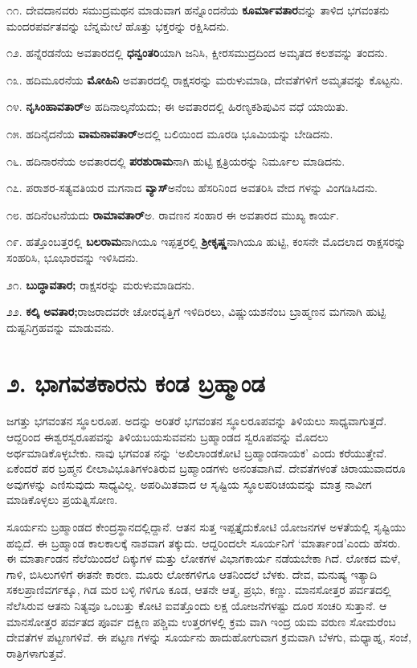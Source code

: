 ೧೧. ದೇವದಾನವರು ಸಮುದ್ರಮಥನ ಮಾಡುವಾಗ ಹನ್ನೊಂದನೆಯ \textbf{ಕೂರ್ಮಾವತಾರ}ವನ್ನು ತಾಳಿದ ಭಗವಂತನು ಮಂದರಪರ್ವತವನ್ನು ಬೆನ್ನಮೇಲೆ ಹೊತ್ತು ಭಕ್ತರನ್ನು ರಕ್ಷಿಸಿದನು.

೧೨. ಹನ್ನೆರಡನೆಯ ಅವತಾರದಲ್ಲಿ \textbf{ಧನ್ವಂತರಿ}ಯಾಗಿ ಜನಿಸಿ, ಕ್ಷೀರಸಮುದ್ರದಿಂದ ಅಮೃತದ ಕಲಶವನ್ನು ತಂದನು.

೧೩. ಹದಿಮೂರನೆಯ \textbf{ಮೋಹಿನಿ} ಅವತಾರದಲ್ಲಿ ರಾಕ್ಷಸರನ್ನು ಮರುಳುಮಾಡಿ, ದೇವತೆಗಳಿಗೆ ಅಮೃತವನ್ನು ಕೊಟ್ಟನು.

೧೪. \textbf{ನೃಸಿಂಹಾವತಾರ್}ಅ ಹದಿನಾಲ್ಕನೆಯದು; ಈ ಅವತಾರದಲ್ಲಿ ಹಿರಣ್ಯಕಶಿಪುವಿನ ವಧೆ ಯಾಯಿತು.

೧೫. ಹದಿನೈದನೆಯ \textbf{ವಾಮನಾವತಾರ್}ಅದಲ್ಲಿ ಬಲಿಯಿಂದ ಮೂರಡಿ ಭೂಮಿಯನ್ನು ಬೇಡಿದನು.

೧೬. ಹದಿನಾರನೆಯ ಅವತಾರದಲ್ಲಿ \textbf{ಪರಶುರಾಮ}ನಾಗಿ ಹುಟ್ಟಿ ಕ್ಷತ್ರಿಯರನ್ನು ನಿರ್ಮೂಲ ಮಾಡಿದನು.

೧೭. ಪರಾಶರ-ಸತ್ಯವತಿಯರ ಮಗನಾದ \textbf{ವ್ಯಾಸ್}ಅನೆಂಬ ಹೆಸರಿನಿಂದ ಅವತರಿಸಿ ವೇದ ಗಳನ್ನು ವಿಂಗಡಿಸಿದನು.

೧೮. ಹದಿನೆಂಟನೆಯದು \textbf{ರಾಮಾವತಾರ್}ಅ. ರಾವಣನ ಸಂಹಾರ ಈ ಅವತಾರದ ಮುಖ್ಯ ಕಾರ್ಯ.

 ೧೯. ಹತ್ತೊಂಬತ್ತರಲ್ಲಿ \textbf{ಬಲರಾಮ}ನಾಗಿಯೂ ಇಪ್ಪತ್ತರಲ್ಲಿ \textbf{ಶ್ರೀಕೃಷ್ಣ}ನಾಗಿಯೂ ಹುಟ್ಟಿ, ಕಂಸನೇ ಮೊದಲಾದ ರಾಕ್ಷಸರನ್ನು ಸಂಹರಿಸಿ, ಭೂಭಾರವನ್ನು ಇಳಿಸಿದನು.

೨೧. \textbf{ಬುದ್ಧಾವತಾರ;} ರಾಕ್ಷಸರನ್ನು ಮರುಳುಮಾಡಿದನು.

೨೨. \textbf{ಕಲ್ಕಿ ಅವತಾರ;}ರಾಜರಾದವರೇ ಚೋರವೃತ್ತಿಗೆ ಇಳಿದಿರಲು, ವಿಷ್ಣುಯಶನೆಂಬ ಬ್ರಾಹ್ಮಣನ ಮಗನಾಗಿ ಹುಟ್ಟಿ ದುಷ್ಟನಿಗ್ರಹವನ್ನು ಮಾಡುವನು.


\section{೨. ಭಾಗವತಕಾರನು ಕಂಡ ಬ್ರಹ್ಮಾಂಡ}

ಜಗತ್ತು ಭಗವಂತನ ಸ್ಥೂಲರೂಪ. ಅದನ್ನು ಅರಿತರೆ ಭಗವಂತನ ಸ್ಥೂಲರೂಪವನ್ನು ತಿಳಿಯಲು ಸಾಧ್ಯವಾಗುತ್ತದೆ. ಆದ್ದರಿಂದ ಈಶ್ವರಸ್ವರೂಪವನ್ನು ತಿಳಿಯಬಯಸುವವನು ಬ್ರಹ್ಮಾಂಡದ ಸ್ವರೂಪವನ್ನು ಮೊದಲು ಅರ್ಥಮಾಡಿಕೊಳ್ಳಬೇಕು. ನಾವು ಭಗವಂತ ನನ್ನು ‘ಅಖಿಲಾಂಡಕೋಟಿ ಬ್ರಹ್ಮಾಂಡನಾಯಕ’ ಎಂದು ಕರೆಯುತ್ತೇವೆ. ಏಕೆಂದರೆ ಪರ ಬ್ರಹ್ಮನ ಲೀಲಾವಿಭೂತಿಗಳಂತಿರುವ ಬ್ರಹ್ಮಾಂಡಗಳು ಅನಂತವಾಗಿವೆ. ದೇವತೆಗಳಂತೆ ಚಿರಾಯುವಾದರೂ ಅವುಗಳನ್ನು ಎಣಿಸುವುದು ಸಾಧ್ಯವಿಲ್ಲ. ಅಪರಿಮಿತವಾದ ಆ ಸೃಷ್ಟಿಯ ಸ್ಥೂಲಪರಿಚಯವನ್ನು ಮಾತ್ರ ನಾವೀಗ ಮಾಡಿಕೊಳ್ಳಲು ಪ್ರಯತ್ನಿಸೋಣ.

ಸೂರ್ಯನು ಬ್ರಹ್ಮಾಂಡದ ಕೇಂದ್ರಸ್ಥಾನದಲ್ಲಿದ್ದಾನೆ. ಆತನ ಸುತ್ತ ಇಪ್ಪತ್ತೈದುಕೋಟಿ ಯೋಜನಗಳ ಅಳತೆಯಲ್ಲಿ ಸೃಷ್ಟಿಯು ಹಬ್ಬಿದೆ. ಈ ಬ್ರಹ್ಮಾಂಡ ಕಾಲಕಾಲಕ್ಕೆ ನಾಶವಾಗ ತಕ್ಕುದು. ಆದ್ದರಿಂದಲೇ ಸೂರ್ಯನಿಗೆ ‘ಮಾರ್ತಾಂಡ’ಎಂದು ಹೆಸರು. ಈ ಮಾರ್ತಾಂಡನ ನೆಲೆಯಿಂದಲೆ ದಿಕ್ಕುಗಳ ಮತ್ತು ಲೋಕಗಳ ವಿಭಾಗಕಾರ್ಯ ನಡೆಯಬೇಕಾ ಗಿದೆ. ಲೋಕದ ಮಳೆ, ಗಾಳಿ, ಬಿಸಿಲುಗಳಿಗೆ ಈತನೇ ಕಾರಣ. ಮೂರು ಲೋಕಗಳಿಗೂ ಆತನಿಂದಲೆ ಬೆಳಕು. ದೇವ, ಮನುಷ್ಯ ಇತ್ಯಾದಿ ಸಕಲಪ್ರಾಣಿವರ್ಗಕ್ಕೂ, ಗಿಡ ಮರ ಬಳ್ಳಿ ಗಳಿಗೂ ಕೂಡ, ಆತನೇ ಆತ್ಮ, ಪ್ರಭು, ಕಣ್ಣು. ಮಾನಸೋತ್ತರ ಪರ್ವತದಲ್ಲಿ ನೆಲೆಸಿರುವ ಆತನು ನಿತ್ಯವೂ ಒಂಬತ್ತು ಕೋಟಿ ಐವತ್ತೊಂದು ಲಕ್ಷ ಯೋಜನೆಗಳಷ್ಟು ದೂರ ಸಂಚರಿ ಸುತ್ತಾನೆ. ಆ ಮಾನಸೋತ್ತರ ಪರ್ವತದ ಪೂರ್ವ ದಕ್ಷಿಣ ಪಶ್ಚಿಮ ಉತ್ತರಗಳಲ್ಲಿ ಕ್ರಮ ವಾಗಿ ಇಂದ್ರ ಯಮ ವರುಣ ಸೋಮರೆಂಬ ದೇವತೆಗಳ ಪಟ್ಟಣಗಳಿವೆ. ಈ ಪಟ್ಟಣ ಗಳನ್ನು ಸೂರ್ಯನು ಹಾದುಹೋಗುವಾಗ ಕ್ರಮವಾಗಿ ಬೆಳಗು, ಮಧ್ಯಾಹ್ನ, ಸಂಜೆ, ರಾತ್ರಿಗಳಾಗುತ್ತವೆ.

